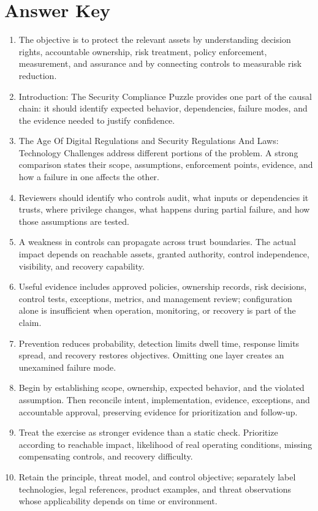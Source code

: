 \documentclass[11pt]{article}
\begin{document}
\section*{Answer Key}
\begin{enumerate}
\item The objective is to protect the relevant assets by understanding decision rights, accountable ownership, risk treatment, policy enforcement, measurement, and assurance and by connecting controls to measurable risk reduction.
\item Introduction: The Security Compliance Puzzle provides one part of the causal chain: it should identify expected behavior, dependencies, failure modes, and the evidence needed to justify confidence.
\item The Age Of Digital Regulations and Security Regulations And Laws: Technology Challenges address different portions of the problem. A strong comparison states their scope, assumptions, enforcement points, evidence, and how a failure in one affects the other.
\item Reviewers should identify who controls audit, what inputs or dependencies it trusts, where privilege changes, what happens during partial failure, and how those assumptions are tested.
\item A weakness in controls can propagate across trust boundaries. The actual impact depends on reachable assets, granted authority, control independence, visibility, and recovery capability.
\item Useful evidence includes approved policies, ownership records, risk decisions, control tests, exceptions, metrics, and management review; configuration alone is insufficient when operation, monitoring, or recovery is part of the claim.
\item Prevention reduces probability, detection limits dwell time, response limits spread, and recovery restores objectives. Omitting one layer creates an unexamined failure mode.
\item Begin by establishing scope, ownership, expected behavior, and the violated assumption. Then reconcile intent, implementation, evidence, exceptions, and accountable approval, preserving evidence for prioritization and follow-up.
\item Treat the exercise as stronger evidence than a static check. Prioritize according to reachable impact, likelihood of real operating conditions, missing compensating controls, and recovery difficulty.
\item Retain the principle, threat model, and control objective; separately label technologies, legal references, product examples, and threat observations whose applicability depends on time or environment.
\end{enumerate}
\end{document}
